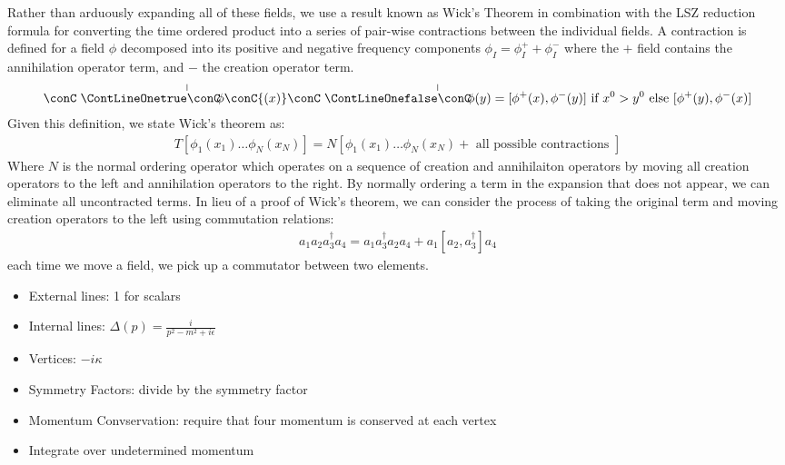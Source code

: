 Rather than arduously expanding all of these fields, we use a result known as Wick's Theorem in combination
with the LSZ reduction formula for converting
the time ordered product into a series of pair-wise contractions between the individual fields. 
A contraction is defined for a field $\phi$ decomposed into its positive and negative 
frequency components $\phi_I = \phi^+_I +\phi^-_I$ where the $+$ field contains the annihilation operator term, and $-$ the creation operator term.
\begin{align*}
\begC1{\phi}\conC{(x)}\endC1{\phi}(y)  = [\phi^+(x),\phi^-(y)] \text{ if } x^0 > y^0 \text{ else } [\phi^+(y),\phi^-(x)] 
\end{align*}
Given this definition, we state Wick's theorem as:
\begin{align*}
T[\phi_1(x_1) \ldots \phi_N(x_N) ] = N \left [ \phi_1(x_1) \ldots \phi_N(x_N) + \text{ all possible contractions }      \right ]
\end{align*}
Where $N$ is the normal ordering operator which operates on a sequence of creation and annihilaiton operators by moving
all creation operators to the left and annihilation operators to the right. By normally ordering a term
in the expansion that does not appear, we can eliminate all uncontracted terms. In lieu of a proof of Wick's theorem, 
we can consider the process of taking the original term and moving creation operators to the left using commutation relations:
\begin{align*}
a_1a_2a^\dagger_3a_4 = a_1 a_3^\dagger a_2 a_4 + a_1 [a_2,a_3^\dagger] a_4 
\end{align*}
each time we move a field, we pick up a commutator between two elements. 


\begin{itemize}
\item External lines: 1 for scalars 
\item Internal lines: $\Delta(p) = \frac{i}{p^2 - m^2+i\epsilon}$
\item Vertices: $-i\kappa$
\item Symmetry Factors: divide by the symmetry factor 
\item Momentum Convservation: require that four momentum is conserved at each vertex 
\item Integrate over undetermined momentum 
\end{itemize}

